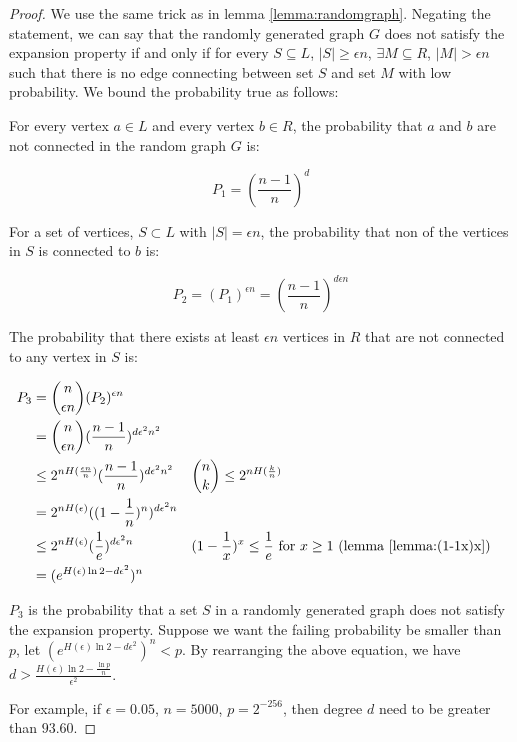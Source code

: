 \begin{proof}

We use the same trick as in lemma \ref{lemma:randomgraph}. Negating the statement, we can say that the randomly generated graph $G$ does not satisfy the expansion property if and only if 
for every $ S \subseteq L$, $|S| \ge \epsilon n$, $\exists M \subseteq R$, $|M| > \epsilon n$ such that there is no edge connecting between set $S$ and set $M$ with low probability. 
We bound the probability true as follows:

For every vertex $a \in L$ and every vertex $b \in R$, the probability that $a$ and $b$ are not connected in the random graph $G$ is:

$$P_1 = (\frac{n-1}{n})^{d}$$

For a set of vertices, $S \subset L$ with $|S| = \epsilon n$, the probability that non of the vertices in $S$ is connected to $b$ is:

$$P_2 = (P_1)^{\epsilon n} = (\frac{n-1}{n})^{d\epsilon n}$$

The probability that there exists at least $\epsilon n$ vertices in $R$ that are not connected to any vertex in $S$ is:

\begin{align}
P_3 &= \binom{n}{\epsilon n} (P_2)^{\epsilon n} \nonumber \\
    &= \binom{n}{\epsilon n} (\frac{n-1}{n})^{d \epsilon^2 n^2} \nonumber \\
    &\le 2^{n H(\frac{\epsilon n}{n})} (\frac{n-1}{n})^{d \epsilon^2 n^2} 
    && \binom{n}{k} \le 2^{n H(\frac{k}{n})} \nonumber \\
    &= 2^{n H(\epsilon)} ((1 - \frac{1}{n})^{n})^{d \epsilon^2 n} \nonumber \\
    &\le 2^{n H(\epsilon)} (\frac{1}{e})^{d \epsilon^2 n} 
    && (1 - \frac{1}{x})^x \le \frac{1}{e} \text{ for } x \ge 1 \text{ (lemma \ref{lemma:(1-1x)x})} \nonumber \\
    &= (e^{ H(\epsilon)\ln 2 - d \epsilon^2})^{n} \nonumber \\
\end{align}

$P_3$ is the probability that a set $S$ in a randomly generated graph does not satisfy the expansion property. Suppose we want the failing probability be smaller than $p$, let $(e^{ H(\epsilon)\ln 2 - d \epsilon^2})^{n} < p$.
By rearranging the above equation, we have $ d > \frac{H(\epsilon) \ln 2 - \frac{\ln p}{n}}{\epsilon^2}$.

For example, if $\epsilon = 0.05$, $n = 5000$, $p = 2^{-256}$, then degree $d$ need to be greater than $93.60$.


\end{proof}
